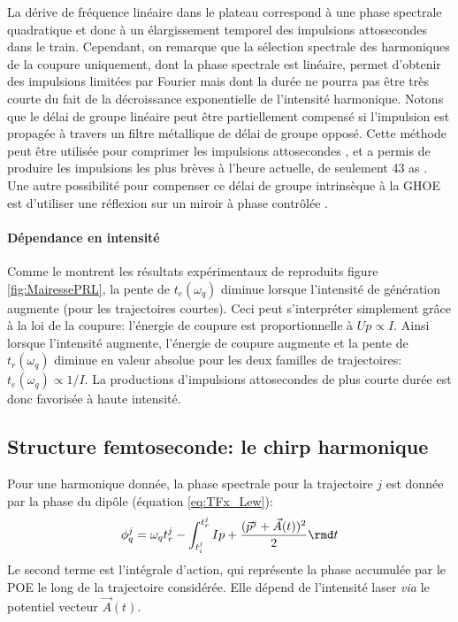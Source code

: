 La dérive de fréquence linéaire dans le plateau correspond à une phase spectrale quadratique et donc à un élargissement temporel des impulsions attosecondes dans le train. Cependant, on remarque que la sélection spectrale des harmoniques de la coupure uniquement, dont la phase spectrale est linéaire, permet d'obtenir des impulsions limitées par Fourier mais dont la durée ne pourra pas être très courte du fait de la décroissance exponentielle de l'intensité harmonique. Notons que le délai de groupe linéaire peut être partiellement compensé si l'impulsion est propagée à travers un filtre métallique de délai de groupe opposé. Cette méthode peut être utilisée pour comprimer les impulsions attosecondes , et a permis de produire les impulsions les plus brèves à l'heure actuelle, de seulement 43 as . Une autre possibilité pour compenser ce délai de groupe intrinsèque à la GHOE est d'utiliser une réflexion sur un miroir à phase contrôlée .

\paragraph{Dépendance en intensité} Comme le montrent les résultats expérimentaux de  reproduits figure \ref{fig:MairessePRL}, la pente de $t_e (\omega_q)$ diminue lorsque l'intensité de génération augmente (pour les trajectoires courtes). Ceci peut s'interpréter simplement grâce à la loi de la coupure: l'énergie de coupure est proportionnelle à $Up \propto I$. Ainsi lorsque l'intensité augmente, l'énergie de coupure augmente et la pente de $t_r (\omega_q)$ diminue en valeur absolue pour les deux familles de trajectoires: $t_e (\omega_q) \propto 1/I $. La productions d'impulsions attosecondes de plus courte durée est donc favorisée à haute intensité.

\subsection{Structure femtoseconde: le chirp harmonique}
Pour une harmonique donnée, la phase spectrale pour la trajectoire $j$ est donnée par la phase du dipôle (équation \ref{eq:TFx_Lew}):
\begin{equation}
\phi_q^j = \omega_q t_r^j - \int_{t_i^j}^{t_r^j} Ip + \frac{(\vec{p}^j + \vec{A}(t))^2}{2} \rmd t
\label{eq:PhaseHarmonique}
\end{equation}
Le second terme est l'intégrale d'action, qui représente la phase accumulée par le POE le long de la trajectoire considérée. Elle dépend de l'intensité laser \textit{via} le potentiel vecteur $\vec{A}(t)$.

